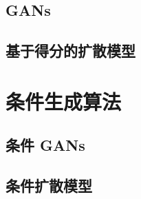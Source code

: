 \subsection{GANs}
\subsection{基于得分的扩散模型}

\section{条件生成算法}
\subsection{条件 GANs}
\subsection{条件扩散模型}

\newpage
